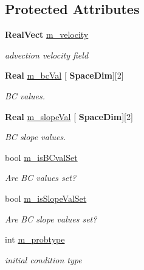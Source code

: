 \subsection*{Protected Attributes}
\begin{DoxyCompactItemize}
\item 
\mbox{\label{class_vel_i_b_c_a3e9192d36c775a9b052578c5ec6a3afc}} 
\textbf{ Real\+Vect} \hyperlink{class_vel_i_b_c_a3e9192d36c775a9b052578c5ec6a3afc}{m\+\_\+velocity}
\begin{DoxyCompactList}\small\item\em advection velocity field \end{DoxyCompactList}\item 
\mbox{\label{class_vel_i_b_c_aff3f3f8a757a0116c190cdceb78b8547}} 
\textbf{ Real} \hyperlink{class_vel_i_b_c_aff3f3f8a757a0116c190cdceb78b8547}{m\+\_\+bc\+Val} \mbox{[}\textbf{ Space\+Dim}\mbox{]}\mbox{[}2\mbox{]}
\begin{DoxyCompactList}\small\item\em BC values. \end{DoxyCompactList}\item 
\mbox{\label{class_vel_i_b_c_a3cfacea013daf4121ebfbf1e2ef2b36d}} 
\textbf{ Real} \hyperlink{class_vel_i_b_c_a3cfacea013daf4121ebfbf1e2ef2b36d}{m\+\_\+slope\+Val} \mbox{[}\textbf{ Space\+Dim}\mbox{]}\mbox{[}2\mbox{]}
\begin{DoxyCompactList}\small\item\em BC slope values. \end{DoxyCompactList}\item 
\mbox{\label{class_vel_i_b_c_a4d82a0285b2fd37173521c2e478d5cc7}} 
bool \hyperlink{class_vel_i_b_c_a4d82a0285b2fd37173521c2e478d5cc7}{m\+\_\+is\+B\+Cval\+Set}
\begin{DoxyCompactList}\small\item\em Are BC values set? \end{DoxyCompactList}\item 
\mbox{\label{class_vel_i_b_c_ab2a7f49e9b7d93a22ecdffbd65516ca8}} 
bool \hyperlink{class_vel_i_b_c_ab2a7f49e9b7d93a22ecdffbd65516ca8}{m\+\_\+is\+Slope\+Val\+Set}
\begin{DoxyCompactList}\small\item\em Are BC slope values set? \end{DoxyCompactList}\item 
\mbox{\label{class_vel_i_b_c_a994f298ad10972ec9b53d8a74e26d3c8}} 
int \hyperlink{class_vel_i_b_c_a994f298ad10972ec9b53d8a74e26d3c8}{m\+\_\+probtype}
\begin{DoxyCompactList}\small\item\em initial condition type \end{DoxyCompactList}\end{DoxyCompactItemize}



